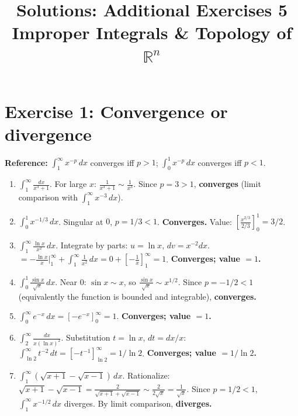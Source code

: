 \documentclass[12pt,a4paper]{article}
\title{\textbf{Solutions: Additional Exercises 5}\\
\large Improper Integrals \& Topology of $\mathbb{R}^n$}
\date{}
\begin{document}
\maketitle
\thispagestyle{empty}

\section*{Exercise 1: Convergence or divergence}

\textbf{Reference:} $\int_1^\infty x^{-p}\,dx$ converges iff $p>1$; $\int_0^1 x^{-p}\,dx$ converges iff $p<1$.

\begin{enumerate}[leftmargin=*, label=(\alph*)]

\item $\int_1^\infty\frac{dx}{x^3+1}$. For large $x$: $\frac{1}{x^3+1}\sim\frac{1}{x^3}$. Since $p=3>1$, \textbf{converges} (limit comparison with $\int_1^\infty x^{-3}\,dx$).

\item $\int_0^1 x^{-1/3}\,dx$. Singular at $0$, $p=1/3<1$. \textbf{Converges.} Value: $\left[\frac{x^{2/3}}{2/3}\right]_0^1=3/2$.

\item $\int_1^\infty\frac{\ln x}{x^2}\,dx$. Integrate by parts: $u=\ln x$, $dv=x^{-2}dx$.
$=-\frac{\ln x}{x}\Big|_1^\infty+\int_1^\infty\frac{1}{x^2}\,dx=0+\left[-\frac{1}{x}\right]_1^\infty=1$.
\textbf{Converges; value $=1$.}

\item $\int_0^1\frac{\sin x}{\sqrt{x}}\,dx$. Near $0$: $\sin x\sim x$, so $\frac{\sin x}{\sqrt{x}}\sim x^{1/2}$. Since $p=-1/2<1$ (equivalently the function is bounded and integrable), \textbf{converges.}

\item $\int_0^\infty e^{-x}\,dx=\left[-e^{-x}\right]_0^\infty=1$. \textbf{Converges; value $=1$.}

\item $\int_2^\infty\frac{dx}{x(\ln x)^2}$. Substitution $t=\ln x$, $dt=dx/x$:
$\int_{\ln 2}^\infty t^{-2}\,dt=\left[-t^{-1}\right]_{\ln 2}^\infty=1/\ln 2$.
\textbf{Converges; value $=1/\ln 2$.}

\item $\int_1^\infty(\sqrt{x+1}-\sqrt{x-1})\,dx$. Rationalize:
$\sqrt{x+1}-\sqrt{x-1}=\frac{2}{\sqrt{x+1}+\sqrt{x-1}}\sim\frac{2}{2\sqrt{x}}=\frac{1}{\sqrt{x}}$.
Since $p=1/2<1$, $\int_1^\infty x^{-1/2}\,dx$ diverges. By limit comparison, \textbf{diverges.}


\end{enumerate}
\end{document}
